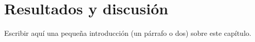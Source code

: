 \chapter{Resultados y discusión}
\label{chap:05res-disc}

Escribir aquí una pequeña introducción (un párrafo o dos) sobre este capítulo.
